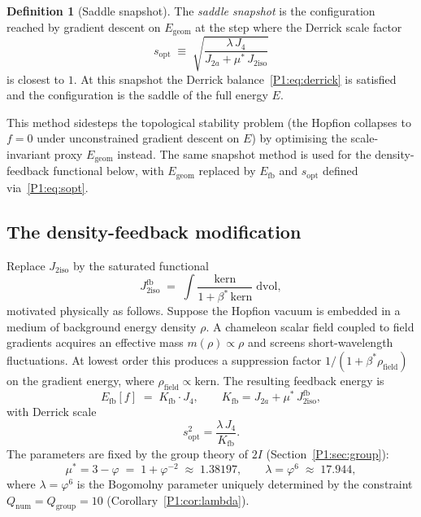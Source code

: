 \documentclass[11pt,a4paper]{article}
\theoremstyle{definition}
\newtheorem{definition}[theorem]{Definition}
\theoremstyle{remark}
\newcommand{\vp}{\varphi}
\newcommand{\ms}{\mu^{*}}
\newcommand{\lam}{\lambda}
\newcommand{\bst}{\beta^{*}}
\newcommand{\Kfb}{K_{\mathrm{fb}}}
\newcommand{\Efb}{E_{\mathrm{fb}}}
\newcommand{\Jfb}{J_{2\mathrm{iso}}^{\mathrm{fb}}}
\newcommand{\Ja}{J_{2a}}
\newcommand{\Jiso}{J_{2\mathrm{iso}}}
\newcommand{\Jfour}{J_{4}}
\newcommand{\sopt}{s_{\mathrm{opt}}}
\begin{document}
\begin{definition}[Saddle snapshot]
\label{P1:def:snapshot}
The \emph{saddle snapshot} is the configuration reached by gradient
descent on $E_{\mathrm{geom}}$ at the step where the Derrick scale
factor
\begin{equation}
  \sopt \;\equiv\; \sqrt{\frac{\lam\,\Jfour}{\Ja+\ms\,\Jiso}}
  \label{P1:eq:sopt_std}
\end{equation}
is closest to $1$.  At this snapshot the Derrick
balance~\eqref{P1:eq:derrick} is satisfied and the configuration is the
saddle of the full energy $E$.
\end{definition}

This method sidesteps the topological stability problem (the Hopfion
collapses to $f=0$ under unconstrained gradient descent on $E$)
by optimising the scale-invariant proxy $E_{\mathrm{geom}}$ instead.
The same snapshot method is used for the density-feedback functional
below, with $E_{\mathrm{geom}}$ replaced by $\Efb$ and $\sopt$ defined
via~\eqref{P1:eq:sopt}.

\subsection{The density-feedback modification}
\label{P1:sec:feedback}

Replace $\Jiso$ by the saturated functional
\begin{equation}
  \boxed{\Jfb \;=\; \int \frac{\mathrm{kern}}{1+\bst\,\mathrm{kern}}\;\mathrm{dvol},}
  \label{P1:eq:Jfb}
\end{equation}
motivated physically as follows.  Suppose the Hopfion vacuum is embedded
in a medium of background energy density $\rho$.  A chameleon scalar field
coupled to field gradients acquires an effective mass $m(\rho)\propto\rho$
and screens short-wavelength fluctuations.  At lowest order this produces a
suppression factor $1/(1+\bst\rho_{\mathrm{field}})$ on the gradient energy,
where $\rho_{\mathrm{field}} \propto \mathrm{kern}$.  The resulting feedback
energy is
\begin{equation}
  \Efb[f] \;=\; \Kfb\cdot\Jfour,
  \qquad
  \Kfb = \Ja + \ms\,\Jfb,
  \label{P1:eq:Efb}
\end{equation}
with Derrick scale
\begin{equation}
  \sopt^2 = \frac{\lam\,\Jfour}{\Kfb}.
  \label{P1:eq:sopt}
\end{equation}
The parameters are fixed by the group theory of $2I$
(Section~\ref{P1:sec:group}):
\begin{equation}
  \ms = 3 - \vp \;=\; 1 + \vp^{-2} \;\approx\; 1.38197,
  \qquad
  \lam = \vp^6 \;\approx\; 17.944,
  \label{P1:eq:params}
\end{equation}
where $\lam = \vp^6$ is the Bogomolny parameter uniquely determined by
the constraint $Q_{\mathrm{num}} = Q_{\mathrm{group}} = 10$
(Corollary~\ref{P1:cor:lambda}).
\end{document}
